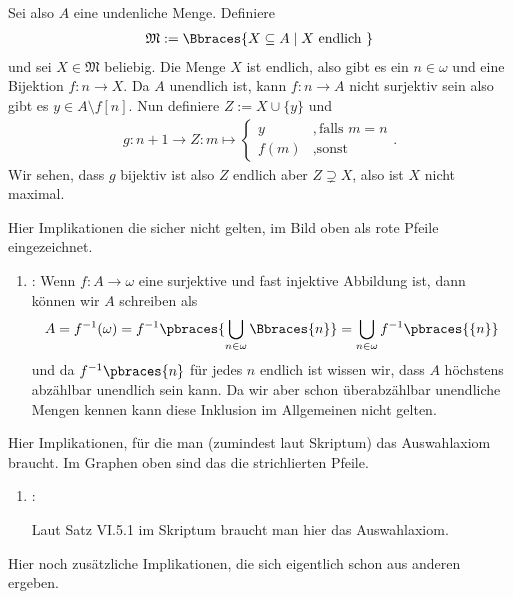 \begin{solution}
\begin{enumerate}[label = \texttt{ad}]
	Sei also $A$ eine undenliche Menge. Definiere
	\begin{align*}
	\mathfrak{M}:=\Bbraces{X \subseteq A \mid X \text{ endlich }}
	\end{align*}
	und sei $X \in \mathfrak{M}$ beliebig. Die Menge $X$ ist endlich, also gibt es ein $n \in \omega$ und eine Bijektion $f:n \to X$. Da $A$ unendlich ist, kann $f:n \to A$ nicht surjektiv sein also gibt es $y \in A \setminus f[n]$. Nun definiere $Z := X \cup \{y\}$ und
	\begin{align*}
	g:n + 1 \to Z: m \mapsto
	\begin{cases}
	y & ,\text{falls } m = n \\
	f(m) & ,\text{sonst }
	\end{cases}.
	\end{align*}
	Wir sehen, dass $g$ bijektiv ist also $Z$ endlich aber $Z \supsetneq X$, also ist $X$ nicht maximal.
\end{enumerate}




Hier Implikationen die sicher nicht gelten, im Bild oben als rote Pfeile eingezeichnet.

\begin{enumerate}[label = \texttt{ad}]
	\item {}: Wenn $f: A \to \omega$ eine surjektive und fast injektive Abbildung ist, dann können wir $A$ schreiben als
	\begin{align*}
		A = f^{-1}(\omega) = f^{-1}\pbraces{\bigcup_{n \in \omega} \Bbraces{n}} = \bigcup_{n \in \omega} f^{-1}\pbraces{\{n\}}
	\end{align*}
	und da $f^{-1}\pbraces{{n}}$ für jedes $n$ endlich ist wissen wir, dass $A$ höchstens abzählbar unendlich sein kann. Da wir aber schon überabzählbar unendliche Mengen kennen kann diese Inklusion im Allgemeinen nicht gelten. 
\end{enumerate}


Hier Implikationen, für die man (zumindest laut Skriptum) das Auswahlaxiom braucht. Im Graphen oben sind das die strichlierten Pfeile.
\begin{enumerate}[label = \texttt{ad}]
	\item {}:
	
	Laut Satz VI.5.1 im Skriptum braucht man hier das Auswahlaxiom.
\end{enumerate}


Hier noch zusätzliche Implikationen, die sich eigentlich schon aus anderen ergeben.



\end{solution}
